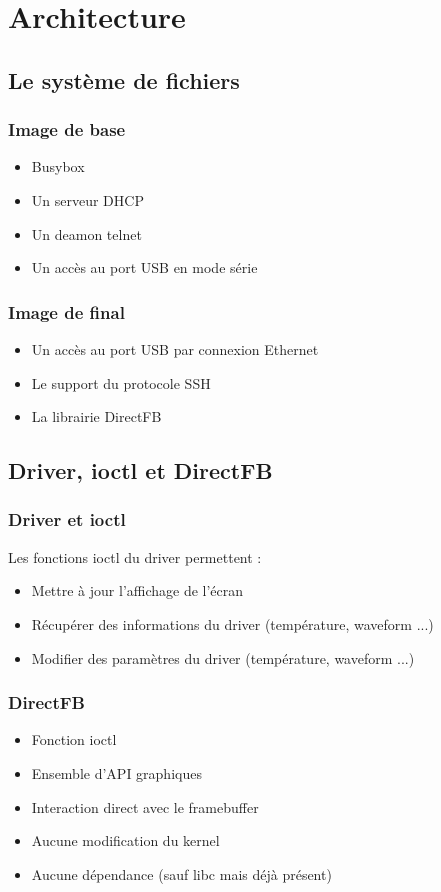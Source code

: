 \section{Architecture}
\subsection{Le système de fichiers}
\begin{frame}
\frametitle{Image de base}

\begin{itemize}
\item Busybox
\item Un serveur DHCP
\item Un deamon telnet
\item Un accès au port USB en mode série 
\end{itemize}

\end{frame}

\begin{frame}
\frametitle{Image de final}

\begin{itemize}
\item Un accès au port USB par connexion Ethernet
\item Le support du protocole SSH
\item La librairie DirectFB
\end{itemize}

\end{frame}

\subsection{Driver, ioctl et DirectFB}

\begin{frame}
\frametitle{Driver et ioctl}

Les fonctions ioctl du driver permettent :
\begin{itemize}
\item Mettre à jour l'affichage de l'écran
\item Récupérer des informations du driver (température, waveform ...)
\item Modifier des paramètres du driver (température, waveform ...)
\end{itemize}

\end{frame}

\begin{frame}
\frametitle{DirectFB}

\begin{itemize}
\item Fonction ioctl
\item Ensemble d'API graphiques
\item Interaction direct avec le framebuffer 
\item Aucune modification du kernel
\item Aucune dépendance (sauf libc mais déjà présent)
\end{itemize}

\end{frame}

